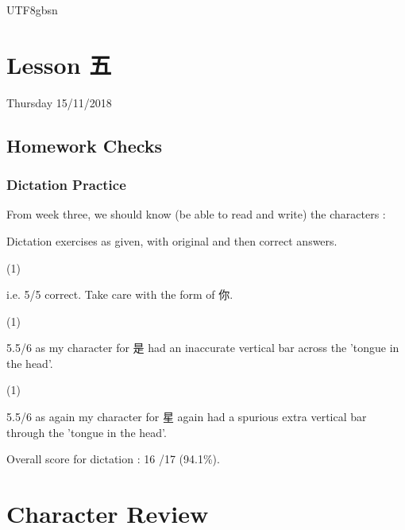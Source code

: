 \documentclass{article}
\newcommand{\myfont}{gbsn} %
\begin{document}
 
\begin{CJK}{UTF8}{\myfont} 
\section{Lesson 五}

Thursday 15/11/2018

\subsection{Homework Checks}

\subsubsection{Dictation Practice}

From week three, we should know (be able to read and write) the characters :

Dictation exercises as given, with original and then correct answers.

\begin{question}
  \begin{tasks}(1)
  \end{tasks}
\end{question}

i.e. 5/5 correct.  Take care with the form of 你.

\begin{question}
  \begin{tasks}(1)
  \end{tasks}
\end{question}

5.5/6 as my character for 是 had an inaccurate vertical bar across the 'tongue in the head'.

\begin{question}
  \begin{tasks}(1)
  \end{tasks}
\end{question}

5.5/6 as again my character for 星 again had a spurious extra vertical bar through the 'tongue in the head'.

Overall score for dictation : 16 /17 (94.1\%).

\section{Character Review}


\end{CJK}
\end{document}
